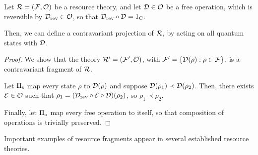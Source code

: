 \documentclass[pra,
aps,
twocolumn,
superscriptaddress,
groupedaddress,
nofootinbib,
reprint
]{revtex4-1}
\begin{document}
\begin{proposition}
	Let $\mathcal{R} = (\mathcal{F},\mathcal{O})$ be a resource theory, and let $\mathcal{D} \in \mathcal{O}$ be a free operation, which is reversible by $\mathcal{D}_{\rm{rev}} \in \mathcal{O}$, so that $\mathcal{D}_{\rm{rev}} \circ \mathcal{D} = 1_{\rm{C}}$.
	
	Then, we can define a contravariant projection of $\mathcal{R}$, by acting on all quantum states with $\mathcal{D}$.
\end{proposition}
\begin{proof}
	We show that the theory $\mathcal{R}' = (\mathcal{F}', \mathcal{O})$, with $\mathcal{F}' = \{\mathcal{D}(\rho):\rho \in \mathcal{F} \}$, is a contravariant fragment of $\mathcal{R}$.
	
	Let $\Pi_{\rm{s}}$ map every state $\rho$ to $\mathcal{D}(\rho)$ and suppose $\mathcal{D}(\rho_1) \prec \mathcal{D}(\rho_2)$. 
	Then, there exists $\mathcal{E} \in \mathcal{O}$ such that $\rho_1 = (\mathcal{D}_{\rm{rev}} \circ \mathcal{E} \circ \mathcal{D}) (\rho_2)$, so $\rho_1 \prec \rho_2$.
	
	Finally, let $\Pi_{\rm{o}}$ map every free operation to itself, so that composition of operations is trivially preserved.
	
\end{proof}

Important examples of resource fragments appear in several established resource theories.  
\end{document}
